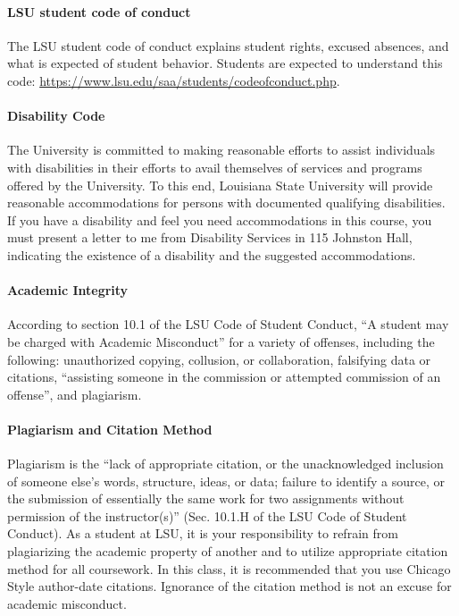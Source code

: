 \documentclass[11pt,article,oneside]{memoir}
\begin{document}
\paragraph{LSU student code of conduct}
The LSU student code of conduct explains 
student rights, excused absences, 
and what is expected of student behavior. 
Students are expected to understand this code:  
\url{https://www.lsu.edu/saa/students/codeofconduct.php}.

\paragraph{Disability Code}
The University is committed to making reasonable efforts 
to assist individuals with disabilities in
their efforts to avail themselves of 
services and programs offered by the University. 
To this end, Louisiana State University will provide 
reasonable accommodations for persons
with documented qualifying disabilities.
If you have a disability and 
feel you need accommodations in this course, 
you must present a letter to me 
from Disability Services in 115 Johnston Hall,
indicating the existence of a disability 
and the suggested accommodations.

\paragraph{Academic Integrity}
According to section 10.1 
of the LSU Code of Student Conduct, 
``A student may be charged with Academic Misconduct'' 
for a variety of offenses, including the following: 
unauthorized copying, collusion, or collaboration,
falsifying data or citations,
``assisting someone in the commission 
or attempted commission of an offense'',
and plagiarism.

\paragraph{Plagiarism and Citation Method}
Plagiarism is the 
``lack of appropriate citation, or the unacknowledged inclusion 
of someone else's words, structure, ideas, or data; 
failure to identify a source, 
or the submission of essentially the same work 
for two assignments without permission of the instructor(s)'' 
(Sec. 10.1.H of the LSU Code of Student Conduct). 
As a student at LSU, 
it is your responsibility to refrain from 
plagiarizing the academic property of another 
and to utilize appropriate citation method for all coursework. 
In this class, it is recommended that you use 
Chicago Style author-date citations. 
Ignorance of the citation method
is not an excuse for academic misconduct.
\end{document}
